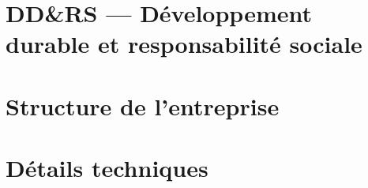 \documentclass[a4paper,11pt,openany]{book}
\begin{document}
\begin{appendices}

%

\chapter{DD\&RS — Développement durable et responsabilité sociale}\label{ch:DDRS}



\chapter{Structure de l’entreprise}


\chapter{Détails techniques}



\end{appendices}
\end{document}
